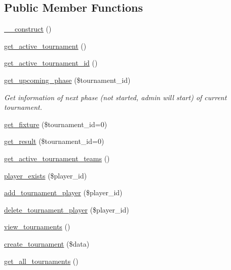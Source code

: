 \subsection*{Public Member Functions}
\begin{DoxyCompactItemize}
\item 
\hyperlink{class_tournament__model_a095c5d389db211932136b53f25f39685}{\+\_\+\+\_\+construct} ()
\item 
\hyperlink{class_tournament__model_ae681965e8413c0294e1a4aaeb342c4bf}{get\+\_\+active\+\_\+tournament} ()
\item 
\hyperlink{class_tournament__model_a938af0306c1d67227a528fbfae41983e}{get\+\_\+active\+\_\+tournament\+\_\+id} ()
\item 
\hyperlink{class_tournament__model_a44a260e1998372620f9fb17568e31283}{get\+\_\+upcoming\+\_\+phase} (\$tournament\+\_\+id)
\begin{DoxyCompactList}\small\item\em Get information of next phase (not started, admin will start) of current tournament. \end{DoxyCompactList}\item 
\hyperlink{class_tournament__model_abd4c2097e05706af3407615dfaaf9032}{get\+\_\+fixture} (\$tournament\+\_\+id=0)
\item 
\hyperlink{class_tournament__model_a840498ff96cdf134d325b23f4983d327}{get\+\_\+result} (\$tournament\+\_\+id=0)
\item 
\hyperlink{class_tournament__model_a7abc276bb6a1ca913d154a927cf6c572}{get\+\_\+active\+\_\+tournament\+\_\+teams} ()
\item 
\hyperlink{class_tournament__model_a46df199068a44e9ed332e82ed56ebc4f}{player\+\_\+exists} (\$player\+\_\+id)
\item 
\hyperlink{class_tournament__model_ad84b3f5fc9f4b4251256beb8f6ee0366}{add\+\_\+tournament\+\_\+player} (\$player\+\_\+id)
\item 
\hyperlink{class_tournament__model_aa93b198f1e6bf812215862b632bdacf4}{delete\+\_\+tournament\+\_\+player} (\$player\+\_\+id)
\item 
\hyperlink{class_tournament__model_a8826dc4b8e2dd947b880342848fd3698}{view\+\_\+tournaments} ()
\item 
\hyperlink{class_tournament__model_a784fe6ee7235433416f536c7c00d6277}{create\+\_\+tournament} (\$data)
\item 
\hyperlink{class_tournament__model_a4903139706bb30df6eddb06f51bc76f4}{get\+\_\+all\+\_\+tournaments} ()
\item 

\end{DoxyCompactItemize}

